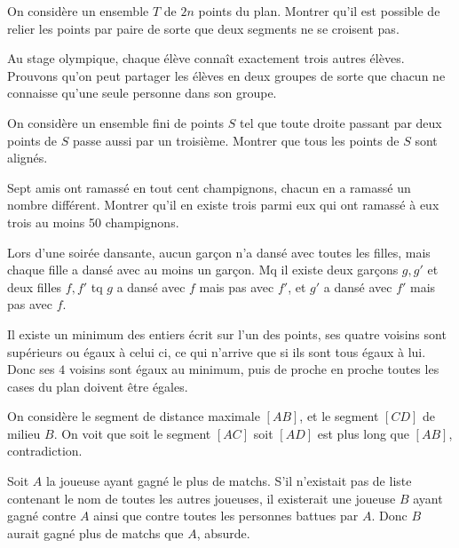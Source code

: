 \begin{exo}
On considère un ensemble $T$ de $2n$ points du plan. Montrer qu'il est possible de relier les points par paire de sorte que deux segments ne se croisent pas.  
\end{exo}

\begin{exo}
Au stage olympique, chaque élève connaît exactement trois autres élèves. Prouvons qu’on peut partager les élèves en deux groupes de sorte que chacun ne connaisse qu’une
seule personne dans son groupe.
\end{exo}

\begin{exo}
On considère un ensemble fini de points $S$ tel que toute droite passant par deux points de $S$ passe aussi par un troisième. Montrer que tous les points de $S$ sont alignés. 
\end{exo}

\begin{exo}
Sept amis ont ramassé en tout cent champignons, chacun en a ramassé un nombre différent. Montrer qu’il en existe trois parmi eux qui ont ramassé à eux trois au moins 50 champignons.
\end{exo}

\begin{exo}
Lors d’une soirée dansante, aucun garçon n’a dansé avec toutes les filles, mais chaque fille a dansé avec au moins un garçon. Mq il existe deux garçons $g, g'$ et deux filles $f, f'$ tq $g$ a dansé avec $f$ mais pas avec $f'$, et $g'$ a dansé avec $f'$ mais pas avec $f$.
\end{exo}



\begin{sol}
 Il existe un minimum des entiers écrit sur l'un des points, ses quatre voisins sont supérieurs ou égaux à celui ci, ce qui n'arrive que si ils sont tous égaux à lui. Donc ses $4$ voisins sont égaux au minimum, puis de proche en proche toutes les cases du plan doivent être égales. 
\end{sol}


\begin{sol}
On considère le segment de distance maximale $[AB]$, et le segment $[CD]$ de milieu $B$. On voit que soit le segment $[AC]$ soit $[AD]$ est plus long que $[AB]$, contradiction.
\end{sol}

\begin{sol}
Soit $A$ la joueuse ayant gagné le plus de matchs. S’il n’existait pas de liste contenant le nom de toutes les autres joueuses, il existerait une joueuse $B$ ayant gagné contre $A$ ainsi que contre toutes les personnes battues par $A$. Donc $B$ aurait gagné plus de matchs que $A$, absurde.
\end{sol}


